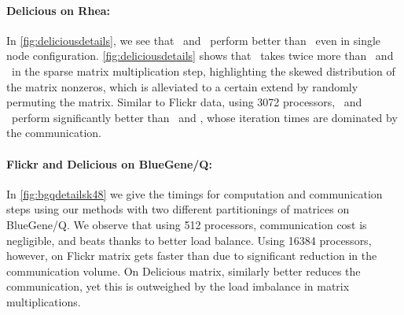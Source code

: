 \paragraph{Delicious on Rhea:} In \cref{fig:deliciousdetails}, we see that \crp\ and \cpp\ perform better than \unp\ even in single node configuration. \cref{fig:deliciousdetails} shows that \unp\ takes twice more than \crp\ and \cpp\ in the sparse matrix multiplication step, highlighting the skewed distribution of the matrix nonzeros, which is alleviated to a certain extend by randomly permuting the matrix.
Similar to Flickr data, using 3072 processors, \crp\ and \cpp\ perform significantly better than \unp\  and \urp, whose iteration times are dominated by the communication. 

\paragraph{Flickr and Delicious on BlueGene/Q:}
In \cref{fig:bgqdetailsk48} we give the timings for computation and communication steps using our methods with two different partitionings of matrices on BlueGene/Q.
We observe that using 512 processors, communication cost is negligible, and \crp beats \cpp thanks to better load balance.
Using 16384 processors, however, on Flickr matrix \cpp gets faster than \crp due to significant reduction in the communication volume.
On Delicious matrix, \cpp similarly better reduces the communication, yet this is outweighed by the load imbalance in matrix multiplications.


